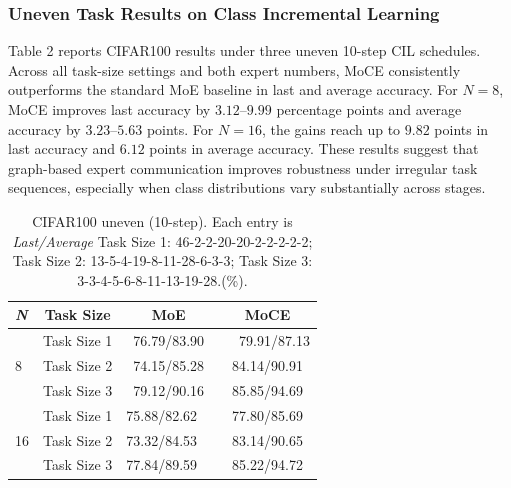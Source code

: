 \documentclass{article}
\theoremstyle{definition}
\theoremstyle{remark}
\begin{document}
\subsubsection{Uneven Task Results on Class Incremental Learning}
Table 2 reports CIFAR100 results under three uneven 10-step CIL schedules. Across all task-size settings and both expert numbers, MoCE consistently outperforms the standard MoE baseline in last and average accuracy. For $N=8$, MoCE improves last accuracy by $3.12$--$9.99$ percentage points and average accuracy by $3.23$--$5.63$ points. For $N=16$, the gains reach up to $9.82$ points in last accuracy and $6.12$ points in average accuracy. These results suggest that graph-based expert communication improves robustness under irregular task sequences, especially when class distributions vary substantially across stages.
\begin{table}[H]
\centering
\scriptsize
\setlength{\tabcolsep}{12pt}

\label{tab:cifar100_uneven_n8_ieee}
\begin{tabular}{lccc}
\toprule
\textit{\textbf{N}} & Task Size & MoE & MoCE \\
\midrule
 & Task Size 1 & 76.79/83.90 &  79.91/87.13 \\
8& Task Size 2 & 74.15/85.28 & 84.14/90.91 \\
 & Task Size 3 & 79.12/90.16 & 85.85/94.69 \\
\bottomrule

 & Task Size 1 & 75.88/82.62  & 77.80/85.69 \\
16& Task Size 2 & 73.32/84.53  & 83.14/90.65 \\
 & Task Size 3 & 77.84/89.59  & 85.22/94.72 \\
\bottomrule
\end{tabular}
\vspace{1mm}

\caption{CIFAR100 uneven (10-step). Each entry is \textit{Last/Average}
Task Size 1: 46-2-2-20-20-2-2-2-2-2; 
Task Size 2: 13-5-4-19-8-11-28-6-3-3; 
Task Size 3: 3-3-4-5-6-8-11-13-19-28.(\%).}
\footnotesize
\end{table}
\end{document}
